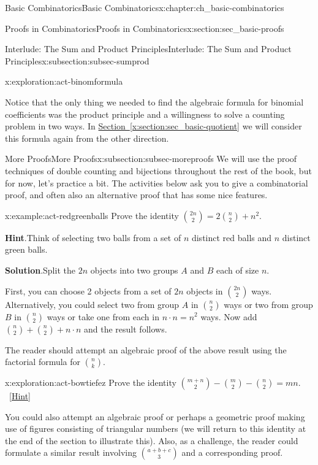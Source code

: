 \documentclass[oneside,10pt,]{book}
\numberwithin{equation}{chapter}
\begin{document}
\begin{chapterptx}{Basic Combinatorics}{}{Basic Combinatorics}{}{}{x:chapter:ch_basic-combinatorics}
\begin{sectionptx}{Proofs in Combinatorics}{}{Proofs in Combinatorics}{}{}{x:section:sec_basic-proofs}
\begin{subsectionptx}{Interlude: The Sum and Product Principles}{}{Interlude: The Sum and Product Principles}{}{}{x:subsection:subsec-sumprod}
\begin{exploration}{}{x:exploration:act-binomformula}
\end{exploration}
Notice that the only thing we needed to find the algebraic formula for binomial coefficients was the product principle and a willingness to solve a counting problem in two ways.  In \hyperref[x:section:sec_basic-quotient]{Section~\ref{x:section:sec_basic-quotient}} we will consider this formula again from the other direction.%
\end{subsectionptx}
%
%
\typeout{************************************************}
\typeout{************************************************}
%
\begin{subsectionptx}{More Proofs}{}{More Proofs}{}{}{x:subsection:subsec-moreproofs}
We will use the proof techniques of double counting and bijections throughout the rest of the book, but for now, let's practice a bit.  The activities below ask you to give a combinatorial proof, and often also an alternative proof that has some nice features.%
\begin{example}{}{x:example:act-redgreenballs}%
Prove the identity \(\binom{2n}{2} = 2 \binom{n}{2} + n^{2}\).%
\par\smallskip%
\noindent\textbf{Hint}.\hypertarget{g:hint:idm1192}{}\quad{}Think of selecting two balls from a set of \(n\) distinct red balls and \(n\) distinct green balls.%
\par\smallskip%
\noindent\textbf{Solution}.\hypertarget{g:solution:idm1196}{}\quad{}Split the \(2n\) objects into two groups \(A\) and \(B\) each of size \(n\).%
\par
First, you can choose 2 objects from a set of \(2n\) objects in \(\binom{2n}{2}\) ways. Alternatively, you could select two from group \(A\) in \(\binom{n}{2}\) ways or two from group \(B\) in \(\binom{n}{2}\) ways or take one from each in \(n \cdot n = n^{2}\) ways. Now add \(\binom{n}{2} + \binom{n}{2}+ n \cdot n\) and the result follows.%
\end{example}
The reader should attempt an algebraic proof of the above result using the factorial formula for \(\binom{n}{k}\).%
\begin{exploration}{}{x:exploration:act-bowtiefez}%
Prove the identity \(\binom{m + n}{2} - \binom{m}{2} - \binom{n}{2} = mn\).%
\qquad~\hfill{\tiny\hyperlink{g:hint:idm1217-back}{[Hint]}}\end{exploration}
You could also attempt an algebraic proof or perhaps a geometric proof making use of figures consisting of triangular numbers (we will return to this identity at the end of the section to illustrate this). Also, as a challenge, the reader could formulate a similar result involving \(\binom{a + b + c}{3}\) and a corresponding proof.%

\end{subsectionptx}
\end{sectionptx}
\end{chapterptx}
\end{document}

